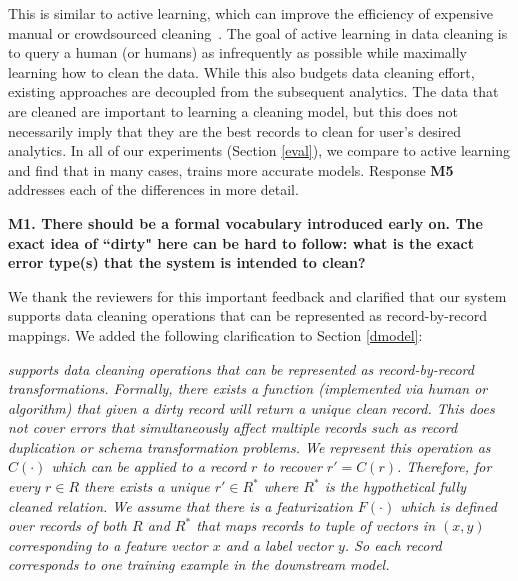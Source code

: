 This is similar to active learning, which can improve the efficiency of expensive manual or crowdsourced cleaning~\cite{gokhale2014corleone, DBLP:journals/pvldb/MozafariSFJM14, DBLP:journals/pvldb/YakoutENOI11}.
The goal of active learning in data cleaning is to query a human (or humans) as infrequently as possible while maximally learning how to clean the data.
While this also budgets data cleaning effort, existing approaches are decoupled from the subsequent analytics.
The data that are cleaned are important to learning a cleaning model, but this does not necessarily imply that they are the best records to clean for user's desired analytics.
In all of our experiments (Section \ref{eval}), we compare to active learning and find that in many cases, \sys trains more accurate models.
Response \textbf{M5} addresses each of the differences in more detail.

\vspace{0.5em}

\noindent\noindent \textbf{M1. There should be a formal vocabulary introduced early on. The exact idea of ``dirty" here can be hard to follow: what is the exact error type(s) that the system is intended to clean?}

\vspace{0.5em}

We thank the reviewers for this important feedback and clarified that our system supports data cleaning operations that can be represented as record-by-record mappings.
We added the following clarification to Section \ref{dmodel}:

\emph{\sys supports data cleaning operations that can be represented as record-by-record transformations.
Formally, there exists a function (implemented via human or algorithm) that given a dirty record will return a unique clean record.
This does not cover errors that simultaneously affect multiple records such as record duplication or schema transformation problems.
We represent this operation as $C(\cdot)$ which can be applied to a record $r$ to recover $r' = C(r)$.
Therefore, for every $r \in R$ there exists a unique $r' \in R^*$ where $R^*$ is the hypothetical fully cleaned relation.
We assume that there is a featurization $F(\cdot)$ which is defined over records of both $R$ and $R^*$ that maps records to tuple of vectors in $(x, y)$ corresponding to a feature vector $x$ and a label vector $y$.
So each record corresponds to one training example in the downstream model.}

